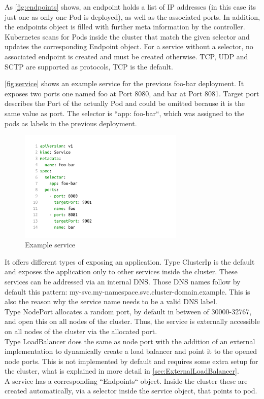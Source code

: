 As \autoref{fig:endpoints} shows, an endpoint holds a list of IP addresses (in this case its just one as only one Pod is deployed), as well as the associated ports.
In addition, the endpoints object is filled with further meta information by the controller.
Kubernetes scans for Pods inside the cluster that match the given selector and updates the corresponding Endpoint object.
For a service without a selector, no associated endpoint is created and must be created otherwise.
TCP, UDP and SCTP are supported as protocols, TCP is the default.

\autoref{fig:service} shows an example service for the previous foo-bar deployment.
It exposes two ports one named foo at Port 8080, and bar at Port 8081.
Target port describes the Port of the actually Pod and could be omitted because it is the same value as port.
The selector is ``app: foo-bar``, which was assigned to the pods as labels in the previous deployment.

\begin{figure}[H]
    \centering
    \includegraphics[width=0.7\textwidth, left]{media/02/service}
    \caption{Example service}
    \label{fig:service}
\end{figure}


It offers different types of exposing an application.
Type ClusterIp is the default and exposes the application only to other services inside the cluster.
These services can be addressed via an internal DNS.
Those DNS names follow by default this pattern: my-svc.my-namespace.svc.cluster-domain.example.
This is also the reason why the service name needs to be a valid DNS label.
\\
Type NodePort allocates a random port, by default in between of 30000-32767, and open this on all nodes of the cluster.
Thus, the service is externally accessible on all nodes of the cluster via the allocated port.
\\
Type LoadBalancer does the same as node port with the addition of an external implementation to dynamically create a load balancer and point it to the opened node ports.
This is not implemented by default and requires some extra setup for the cluster, what is explained in more detail in \autoref{sec:ExternalLoadBalancer}.
\\
A service has a corresponding ``Endpoints`` object.
Inside the cluster these are created automatically, via a selector inside the service object, that points to pod.
